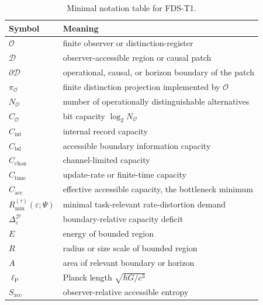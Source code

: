 \documentclass[10pt,a4paper,twocolumn,aps,prl]{revtex4-2}
\newcommand{\Obs}{\mathcal{O}}
\newcommand{\Patch}{\mathcal{D}}
\newcommand{\bd}{\partial}
\newcommand{\ellP}{\ell_{\mathrm P}}
\newcommand{\NA}{N_{\Obs}}
\newcommand{\CA}{C_{\Obs}}
\begin{document}
\begin{table}[t!]
\centering
\small
\renewcommand{\arraystretch}{1.2}
\begin{tabular}{ll}
\toprule
\parbox[t]{2.6cm}{\raggedright\textbf{Symbol}} & \parbox[t]{10.5cm}{\raggedright\textbf{Meaning}}\\
\midrule
$\Obs$ & finite observer or distinction-register\\
$\Patch$ & observer-accessible region or causal patch\\
$\bd\Patch$ & operational, causal, or horizon boundary of the patch\\
$\pi_{\Obs}$ & finite distinction projection implemented by $\Obs$\\
$\NA$ & number of operationally distinguishable alternatives\\
$\CA$ & bit capacity $\log_2\NA$\\
$C_{\mathrm{int}}$ & internal record capacity\\
$C_{\mathrm{bd}}$ & accessible boundary information capacity\\
$C_{\mathrm{chan}}$ & channel-limited capacity\\
$C_{\mathrm{time}}$ & update-rate or finite-time capacity\\
$C_{\mathrm{acc}}$ & effective accessible capacity, the bottleneck minimum\\
$R_{\min}^{(\tau)}(\varepsilon;\Psi)$ & minimal task-relevant rate-distortion demand\\
$\Delta_{\varepsilon}^{\Patch}$ & boundary-relative capacity deficit\\
$E$ & energy of bounded region\\
$R$ & radius or size scale of bounded region\\
$A$ & area of relevant boundary or horizon\\
$\ellP$ & Planck length $\sqrt{\hbar G/c^3}$\\
$S_{\mathrm{acc}}$ & observer-relative accessible entropy\\
\bottomrule
\end{tabular}
\caption{Minimal notation table for FDS-T1.}
\end{table}
\end{document}
